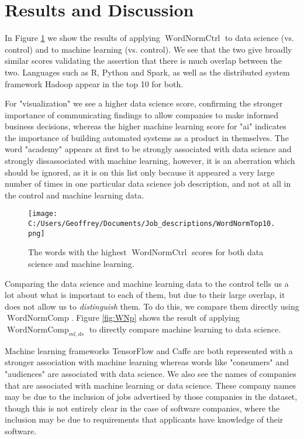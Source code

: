 \documentclass[12pt]{article}
\DeclareMathOperator{\WNt}{WordNormCtrl}
\DeclareMathOperator{\WNp}{WordNormComp}
\begin{document}
\section{Results and Discussion} In Figure \ref{fig:WNt} we show the results of applying $\WNt$ to data science (vs. control) and to machine learning (vs. control). We see that the two give broadly similar scores validating the assertion that there is much overlap between the two. Languages such as R, Python and Spark, as well as the distributed system framework Hadoop appear in the top 10 for both.

For "visualization" we see a higher data science score, confirming the stronger importance of communicating findings to allow companies to make informed business decisions, whereas the higher machine learning score for "ai" indicates the importance of building automated systems as a product in themselves. The word "academy" appears at first to be strongly associated with data science and strongly dissassociated with machine learning, however, it is an aberration which should be ignored, as it is on this list only because it appeared a very large number of times in one particular data science job description, and not at all in the control and machine learning data.

\begin{figure}[h]
\begin{center}
\texttt{[image: C:/Users/Geoffrey/Documents/Job\_descriptions/WordNormTop10.png]}
\end{center}
\caption{\label{fig:WNt} The words with the highest $\WNt$ scores for both data science and machine learning.}
\end{figure}

Comparing the data science and machine learning data to the control tells us a lot about what is important to each of them, but due to their large overlap, it does not allow us to \textit{distinguish} them. To do this, we compare them directly using $\WNp$. Figure \ref{fig:WNp} shows the result of applying $\WNp_{ml,ds}$ to directly compare machine learning to data science.

Machine learning frameworks TensorFlow and Caffe are both represented with a stronger association with machine learning whereas words like "consumers" and "audiences" are associated with data science. We also see the names of companies that are associated with machine learning or data science. These company names may be due to the inclusion of jobs advertised by those companies in the dataset, though this is not entirely clear in the case of software companies, where the inclusion may be due to requirements that applicants have knowledge of their software. 
\end{document}

